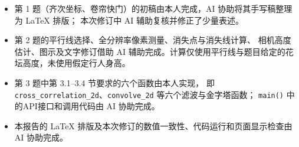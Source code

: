 \documentclass[11pt,a4paper]{ctexart}
\begin{document}
\begin{itemize}
  \item 第 1 题（齐次坐标、卷帘快门）的初稿由本人完成，AI 协助将其手写稿整理为 \LaTeX{} 排版；
        本次修订中 AI 辅助复核并修正了少量表述。
  \item 第 2 题的平行线选择、全分辨率像素测量、消失点与消失线计算、
        相机高度估计、图示及文字修订借助 AI 辅助完成。计算仅使用平行线与题目给定的花坛高度，未使用假定行人身高。
  \item 第 3 题中第 3.1--3.4 节要求的六个函数由本人实现，
        即 \texttt{cross\_correlation\_2d}、\texttt{convolve\_2d} 等六个滤波与金字塔函数；
        \texttt{main()} 中的API接口和调用代码由 AI 协助完成。
  \item 本报告的 \LaTeX{} 排版及本次修订的数值一致性、代码运行和页面显示检查由 AI 协助完成。
\end{itemize}
\end{document}
